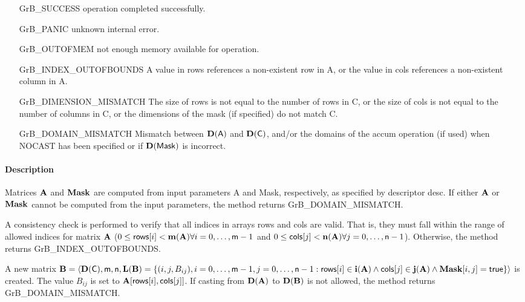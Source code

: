 \begin{itemize}[leftmargin=2.1in]
\item[{\sf GrB\_SUCCESS}]     operation completed successfully.
\item[{\sf GrB\_PANIC}]        unknown internal error.
\item[{\sf GrB\_OUTOFMEM}]    not enough memory available for operation.
\item[{\sf GrB\_INDEX\_OUTOFBOUNDS}]
        A value in {\sf rows} references a non-existent row in {\sf A}, or
        the value in {\sf cols} references a non-existent column in {\sf A}.
\item[{\sf GrB\_DIMENSION\_MISMATCH}] 
        The size of {\sf rows} is not equal to the number of rows in {\sf C}, or
        the size of {\sf cols} is not equal to the number of columns in {\sf C}, or
        the dimensions of the mask (if specified) do not match {\sf C}.
\item[{\sf GrB\_DOMAIN\_MISMATCH}]    Mismatch between $\bold{D}({\sf A})$ and $\bold{D}({\sf C})$, 
                                      and/or the domains of the 
                                      {\sf accum} operation (if used) when {\sf NOCAST} has
                                      been specified or if $\bold{D}(\sf Mask)$ is incorrect.
\end{itemize}


\paragraph{Description}

Matrices ${\bf A}$ and ${\bf Mask}$ are computed from input
parameters {\sf A} and {\sf Mask}, respectively, as specified by
descriptor {\sf desc}.  If either ${\bf A}$ or ${\bf Mask}$
cannot be computed from the input parameters, the method returns {\sf
GrB\_DOMAIN\_MISMATCH}.

A consistency check is performed to verify that all indices in arrays
{\sf rows} and {\sf cols} are valid. That is, they must fall within the range of allowed
indices for matrix ${\bf A}$ ($0 \leq {\sf rows}[i] < \bold{m}({\bf A})
\forall i = 0,\ldots,{\sf m}-1$ and
$0 \leq {\sf cols}[j] < \bold{n}({\bf A}) \forall j = 0,\ldots,{\sf n}-1$).  Otherwise, the method returns {\sf
GrB\_INDEX\_OUTOFBOUNDS}.

A new matrix ${\bf B} = \langle \bold{D}({\sf C}),{\sf m},{\sf n},
\bold{L}({\bf B}) = \{ (i,j,B_{ij}), i = 0,\ldots,{\sf m}-1, j = 0, \ldots,{\sf n}-1 : {\sf rows}[i]
\in \bold{i}({\bf A}) \wedge {\sf cols}[j] \in \bold{j}({\bf A}) \wedge {\bf Mask}[i,j] = {\sf true} \} \rangle$
is created.  The value $B_{ij}$ is set to ${\bf A}[{\sf rows}[i],{\sf cols}[j]]$. If
casting from $\bold{D}({\bf A})$ to $\bold{D}({\bf B})$ is not
allowed, the method returns {\sf GrB\_DOMAIN\_MISMATCH}.

